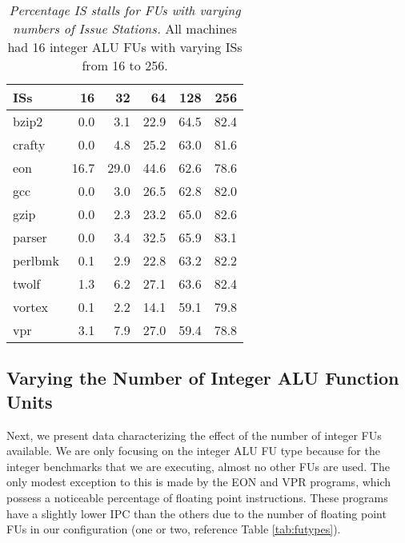 \documentclass[10pt,dvips]{article}
\begin{document}
%
%
\begin{table}[p]
\begin{center}
\caption{{\em Percentage IS stalls for FUs
with varying numbers of Issue Stations.}
All machines had 16 integer ALU FUs with varying ISs from 16 to 256.}
\label{tab:iwsize16waits}
\vspace{+0.1in}
\begin{tabular}{|l||r|r|r|r|r|}
\hline 
{ISs}& 16 & 32 & 64 & 128 & 256 \\
\hline

\hline
bzip2&
0.0 & 3.1 & 22.9 & 64.5 &  82.4 \\

\hline
crafty&
0.0 & 4.8 & 25.2 & 63.0 & 81.6 \\

\hline
eon&
16.7 & 29.0 & 44.6 & 62.6 & 78.6 \\

\hline
gcc&
0.0 & 3.0 & 26.5 & 62.8 & 82.0 \\

\hline
gzip&
0.0 & 2.3 & 23.2 & 65.0 & 82.6 \\

\hline
parser&
0.0 & 3.4 & 32.5 & 65.9 & 83.1 \\

\hline
perlbmk&
0.1 & 2.9 & 22.8 & 63.2 & 82.2 \\

\hline
twolf&
1.3 & 6.2 & 27.1 & 63.6 & 82.4 \\

\hline
vortex&
0.1 & 2.2 & 14.1 & 59.1 & 79.8 \\

\hline
vpr&
3.1 & 7.9 & 27.0 & 59.4 & 78.8 \\

\hline
\end{tabular}
\end{center}
\end{table}
%
%
\subsection{Varying the Number of Integer ALU Function Units}
%
Next, we present data characterizing the effect of the
number of integer FUs available.
We are only focusing on the integer ALU FU type
because for the integer benchmarks that we are executing,
almost no other FUs are used.
The only modest exception to this is made by the EON and VPR programs,
which possess a noticeable percentage of floating point instructions.
These programs have a slightly lower IPC than the others
due to the number of floating point FUs in our configuration
(one or two, reference Table \ref{tab:futypes}).
\end{document}
